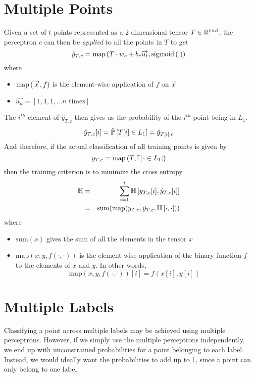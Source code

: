 \documentclass{article}
\begin{document}
\section{Multiple Points}
  Given a set of $t$ points
  represented as a 2 dimensional tensor $T \in \mathbb{R}^{t\times d}$, 
  the perceptron $c$ can then be \emph{applied}
  to all the points in $T$ to get
  \[ \hat y_{T,c} = \text{map}\left(T \cdot w_c + b_c\overrightarrow{u_t},\text{sigmoid}\left(\cdot\right)\right) \]
  where 
  \begin{itemize}
    \item $\text{map}\left(\overrightarrow x,f\right)$ is
            the element-wise application of $f$ on $\overrightarrow x$
    \item $\overrightarrow{u_n} = [1, 1, 1, ... n \text{ times}]$
  \end{itemize}
  The $i^{th}$ element of $\hat y_{T, c}$ then gives us
  the probability of the $i^{th}$ point being in $L_1$.
  \[ \hat y_{T, c}[i] = \mathbb{\hat P}\left[ T[i] \in L_1 \right] = \hat y_{T[i], c}\]
  And therefore, if the actual classification 
  of all training points is given by 
  \[ y_{T,c} = \text{map}\left(T,\mathbb{I}\left[ \cdot \in L_1 \right]\right) \]
  then the training criterion is to minimize the cross entropy
  \begin{eqnarray*}
    \mathbb{H} & = & \sum_{i=1}^t \mathbb{H}\left[ y_{T, c}[i], \hat y_{T, c}[i] \right] \\
               & = & \text{sum}(\text{map}(y_{T, c}, 
                                            \hat y_{T, c}, 
                                            \mathbb{H}\left[ \cdot, \cdot \right]
                                           )
                               )
  \end{eqnarray*}
  where
  \begin{itemize}
    \item $\text{sum}(x)$ gives the sum of all the elements 
          in the tensor $x$
    \item $\text{map}(x, y, f(\cdot, \cdot))$
          is the element-wise application of
          the binary function $f$ to the elements of $x$ and $y$.
          In other words,
          \[ \text{map}(x, y, f(\cdot, \cdot))[i] = f(x[i], y[i]) \]
  \end{itemize}
  
\section{Multiple Labels}
  Classifying a point across multiple labels may be achieved
  using multiple perceptrons.
  However, if we simply use the multiple perceptrons independently,
  we end up with unconstrained probabilities
  for a point belonging to each label.
  Instead, we would ideally want the probabilities to add up to 1,
  since a point can only belong to one label.
  
\end{document}
